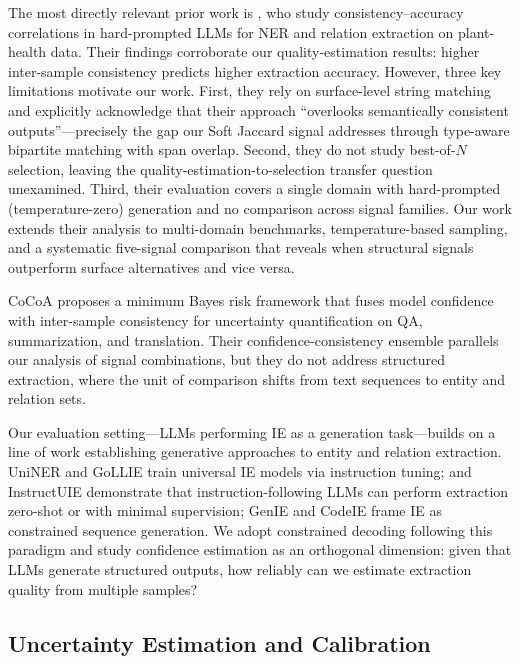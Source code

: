 The most directly relevant prior work is \citet{nedellec2026consistency}, who study consistency--accuracy correlations in hard-prompted LLMs for NER and relation extraction on plant-health data.
Their findings corroborate our quality-estimation results: higher inter-sample consistency predicts higher extraction accuracy.
However, three key limitations motivate our work.
First, they rely on surface-level string matching and explicitly acknowledge that their approach ``overlooks semantically consistent outputs''---precisely the gap our Soft Jaccard signal addresses through type-aware bipartite matching with span overlap.
Second, they do not study best-of-$N$ selection, leaving the quality-estimation-to-selection transfer question unexamined.
Third, their evaluation covers a single domain with hard-prompted (temperature-zero) generation and no comparison across signal families.
Our work extends their analysis to multi-domain benchmarks, temperature-based sampling, and a systematic five-signal comparison that reveals when structural signals outperform surface alternatives and vice versa.

CoCoA \cite{vashurin2025cocoa} proposes a minimum Bayes risk framework that fuses model confidence with inter-sample consistency for uncertainty quantification on QA, summarization, and translation.
Their confidence-consistency ensemble parallels our analysis of signal combinations, but they do not address structured extraction, where the unit of comparison shifts from text sequences to entity and relation sets.

Our evaluation setting---LLMs performing IE as a generation task---builds on a line of work establishing generative approaches to entity and relation extraction.
UniNER \cite{zhou2024uniner} and GoLLIE \cite{sainz2024gollie} train universal IE models via instruction tuning; \citet{wadhwa2023revisiting} and InstructUIE \cite{wang2023instructuie} demonstrate that instruction-following LLMs can perform extraction zero-shot or with minimal supervision; GenIE \cite{josifoski2022genie} and CodeIE \cite{li2023codeie} frame IE as constrained sequence generation.
We adopt constrained decoding \cite{willard2023guided} following this paradigm and study confidence estimation as an orthogonal dimension: given that LLMs generate structured outputs, how reliably can we estimate extraction quality from multiple samples?

\subsection{Uncertainty Estimation and Calibration}

